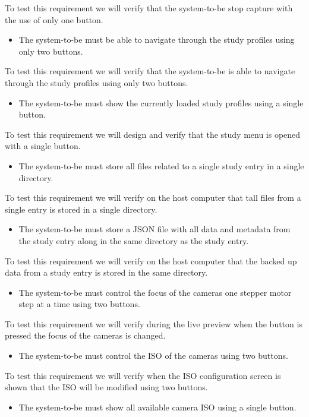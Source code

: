 To test this requirement we will verify that the system-to-be stop capture with the use of only one button.
\begin{itemize}
   \item The system-to-be must be able to navigate through the study profiles using only two buttons.
\end{itemize}
To test this requirement we will verify that the system-to-be is able to navigate through the study profiles using only two buttons.
\begin{itemize}
	\item The system-to-be must show the currently loaded study profiles using a single button.
\end{itemize}
To test this requirement we will design and verify that the study menu is opened with a single button.
\begin{itemize}
    \item The system-to-be must store all files related to a single study entry in a single directory.
\end{itemize}
To test this requirement we will verify on the host computer that tall files from a single entry is stored in a single directory.
\begin{itemize}
    \item The system-to-be must store a JSON file with all data and metadata from the study entry along in the same directory as the study entry.
\end{itemize}
To test this requirement we will verify on the host computer that the backed up data from a study entry is stored in the same directory.
\begin{itemize}
    \item The system-to-be must control the focus of the cameras one stepper motor step at a time using two buttons.
\end{itemize}
To test this requirement we will verify during the live preview when the button is pressed the focus of the cameras is changed.
\begin{itemize}
    \item The system-to-be must control the ISO of the cameras using two buttons.
\end{itemize}
To test this requirement we will verify when the ISO configuration screen is shown that the ISO will be modified using two buttons.
\begin{itemize}
    \item The system-to-be must show all available camera ISO using a single button.
\end{itemize}
